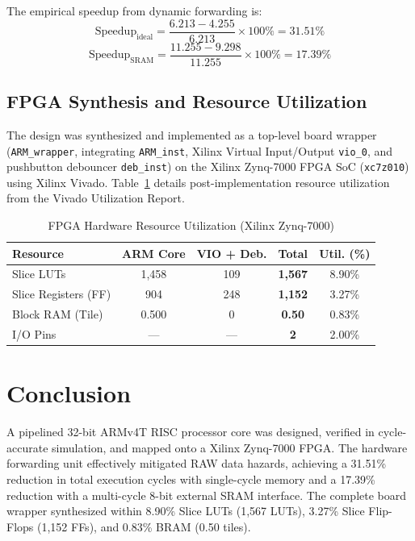 \documentclass[conference]{IEEEtran}
\begin{document}
The empirical speedup from dynamic forwarding is:
\begin{equation}
\text{Speedup}_{\text{ideal}} = \frac{6.213 - 4.255}{6.213} \times 100\% = 31.51\%
\end{equation}
\begin{equation}
\text{Speedup}_{\text{SRAM}} = \frac{11.255 - 9.298}{11.255} \times 100\% = 17.39\%
\end{equation}

\subsection{FPGA Synthesis and Resource Utilization}
The design was synthesized and implemented as a top-level board wrapper (\texttt{ARM\_wrapper}, integrating \texttt{ARM\_inst}, Xilinx Virtual Input/Output \texttt{vio\_0}, and pushbutton debouncer \texttt{deb\_inst}) on the Xilinx Zynq-7000 FPGA SoC (\texttt{xc7z010}) using Xilinx Vivado. Table~\ref{tab:utilization} details post-implementation resource utilization from the Vivado Utilization Report.

\begin{table}[htbp]
\caption{FPGA Hardware Resource Utilization (Xilinx Zynq-7000)}
\label{tab:utilization}
\centering
\begin{tabular}{lcccc}
\toprule
\textbf{Resource} & \textbf{ARM Core} & \textbf{VIO + Deb.} & \textbf{Total} & \textbf{Util. (\%)} \\
\midrule
Slice LUTs & 1,458 & 109 & \textbf{1,567} & 8.90\% \\
Slice Registers (FF) & 904 & 248 & \textbf{1,152} & 3.27\% \\
Block RAM (Tile) & 0.500 & 0 & \textbf{0.50} & 0.83\% \\
I/O Pins & --- & --- & \textbf{2} & 2.00\% \\
\bottomrule
\end{tabular}
\end{table}

\section{Conclusion}
A pipelined 32-bit ARMv4T RISC processor core was designed, verified in cycle-accurate simulation, and mapped onto a Xilinx Zynq-7000 FPGA. The hardware forwarding unit effectively mitigated RAW data hazards, achieving a 31.51\% reduction in total execution cycles with single-cycle memory and a 17.39\% reduction with a multi-cycle 8-bit external SRAM interface. The complete board wrapper synthesized within 8.90\% Slice LUTs (1,567 LUTs), 3.27\% Slice Flip-Flops (1,152 FFs), and 0.83\% BRAM (0.50 tiles).
\end{document}
